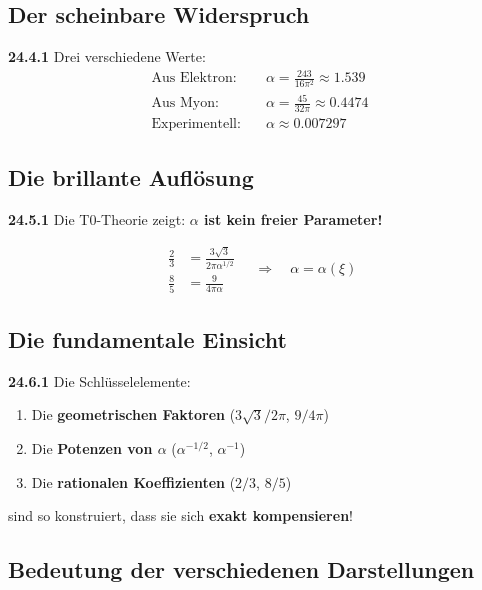 \documentclass[12pt,a4paper]{article}
\begin{document}
\subsection{Der scheinbare Widerspruch}

\noindent \textbf{24.4.1} Drei verschiedene Werte:
\begin{align*}
	\text{Aus Elektron:} &\quad \alpha = \frac{243}{16\pi^2} \approx 1.539 \\
	\text{Aus Myon:} &\quad \alpha = \frac{45}{32\pi} \approx 0.4474 \\
	\text{Experimentell:} &\quad \alpha \approx 0.007297
\end{align*}

\subsection{Die brillante Auflösung}

\noindent \textbf{24.5.1} Die T0-Theorie zeigt: \textbf{$\alpha$ ist kein freier Parameter!}

\[
\boxed{
	\begin{aligned}
		\frac{2}{3} &= \frac{3\sqrt{3}}{2\pi\alpha^{1/2}} \\
		\frac{8}{5} &= \frac{9}{4\pi\alpha}
	\end{aligned}
	\quad \Rightarrow \quad
	\alpha = \alpha(\xi)
}
\]

\subsection{Die fundamentale Einsicht}

\noindent \textbf{24.6.1} Die Schlüsselelemente:
\begin{enumerate}
	\item Die \textbf{geometrischen Faktoren} ($3\sqrt{3}/2\pi$, $9/4\pi$)
	\item Die \textbf{Potenzen von $\alpha$} ($\alpha^{-1/2}$, $\alpha^{-1}$)  
	\item Die \textbf{rationalen Koeffizienten} ($2/3$, $8/5$)
\end{enumerate}

\noindent sind so konstruiert, dass sie sich \textbf{exakt kompensieren}!

\subsection{Bedeutung der verschiedenen Darstellungen}
\end{document}
